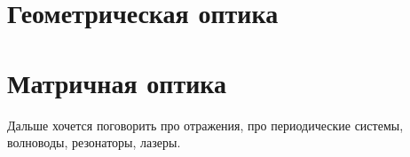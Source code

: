 


\section{Геометрическая оптика}

\newpage 

\section{Матричная оптика}



\newpage
Дальше хочется поговорить про отражения, про периодические системы, волноводы, резонаторы, лазеры.

